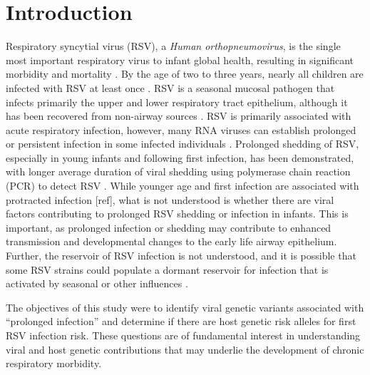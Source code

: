 \documentclass{article} %
\begin{document}
\section{Introduction}
Respiratory syncytial virus (RSV), a \textit{Human orthopneumovirus}, is the single most important respiratory virus to infant global health, resulting in significant morbidity and mortality 
\citep{hall_burden_2009}.
By the age of two to three years, nearly all children are infected with RSV at least once 
\citep{glezen_risk_1986}.
RSV is a seasonal mucosal pathogen that infects primarily the upper and lower respiratory tract epithelium, although it has been recovered from non-airway sources 
\citep{bokun_respiratory_2019,
cubie_detection_1997,
nadal_isolation_1990,
odonnell_respiratory_1998,
rezaee_respiratory_2011,
rohwedder_detection_1998}.
RSV is primarily associated with acute respiratory infection, however, many RNA viruses can establish prolonged or persistent infection in some infected individuals 
\citep{randall2017within}.
Prolonged shedding of RSV, especially in young infants and following first infection, has been demonstrated, with longer average duration of viral shedding using polymerase chain reaction (PCR) to detect RSV 
\citep{munywoki_influence_2015}.
While younger age and first infection are associated with protracted infection [ref], 
what is not understood is whether there are viral factors contributing to prolonged RSV shedding or infection in infants. 
This is important, as prolonged infection or shedding may contribute to enhanced transmission and developmental changes to the early life airway epithelium. 
Further, the reservoir of RSV infection is not understood, 
and it is possible that some RSV strains could populate a dormant reservoir for infection that is activated by seasonal or other influences 
\citep{hobson_persistent_2008}.

The objectives of this study were to identify viral genetic variants associated with ``prolonged infection'' and determine if there are host genetic risk alleles for first RSV infection risk. 
These questions are of fundamental interest in understanding viral and host genetic contributions that may underlie the development of chronic respiratory morbidity.
\end{document}

